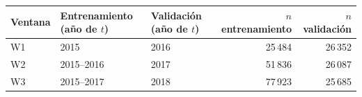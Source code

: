 \begin{tabular}{lllrr}
\toprule
Ventana & Entrenamiento (año de $t$) & Validación (año de $t$) & $n$ entrenamiento & $n$ validación \\
\midrule
W1 & 2015 & 2016 & 25\,484 & 26\,352 \\
W2 & 2015--2016 & 2017 & 51\,836 & 26\,087 \\
W3 & 2015--2017 & 2018 & 77\,923 & 25\,685 \\
\bottomrule
\end{tabular}